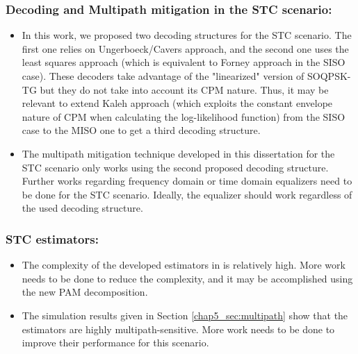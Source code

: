 \subsubsection*{Decoding and Multipath mitigation in the STC scenario:}
\begin{itemize}
\item In this work, we proposed two decoding structures for the STC scenario. The first one relies on Ungerboeck/Cavers approach, and the second one uses the least squares approach (which is equivalent to Forney approach in the SISO case). These decoders take advantage of the "linearized" version of SOQPSK-TG but they do not take into account its CPM nature. Thus, it may be relevant to extend Kaleh approach (which exploits the constant envelope nature of CPM when calculating the log-likelihood function) from the SISO case to the MISO one to get a third decoding structure. 
\item The multipath mitigation technique developed in this dissertation for the STC scenario only works using the second proposed decoding structure. Further works regarding frequency domain or time domain equalizers need to be done for the STC scenario. Ideally, the equalizer should work regardless of the used decoding structure. 
\end{itemize}
   
\subsubsection*{STC estimators:}
\begin{itemize}
\item  The complexity of the developed estimators in \cite{STC_part1} is relatively high. More work needs to be done to reduce the complexity, and it may be accomplished using the new PAM decomposition.   
\item The simulation results given in Section \ref{chap5_sec:multipath} show that the estimators are highly multipath-sensitive. More work needs to be done to improve their performance for this scenario.
\end{itemize}
